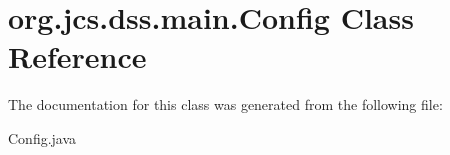 \hypertarget{classorg_1_1jcs_1_1dss_1_1main_1_1Config}{}\section{org.\+jcs.\+dss.\+main.\+Config Class Reference}
\label{classorg_1_1jcs_1_1dss_1_1main_1_1Config}


The documentation for this class was generated from the following file\+:\begin{DoxyCompactItemize}
\item 
Config.\+java\end{DoxyCompactItemize}
